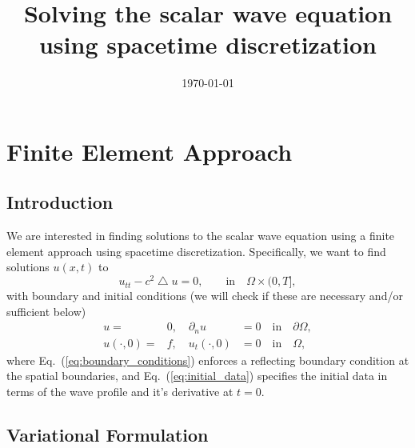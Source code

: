 \documentclass[nofootinbib,preprintnumbers,superscriptaddress,notitlepage]{revtex4-1}
\newcommand{\<}{\begin{equation}}
\newcommand{\?}{\end{equation}}
\begin{document}
\title{Solving the scalar wave equation using spacetime discretization}
\date{\today}
\maketitle

\section{Finite Element Approach}

\subsection{Introduction}

We are interested in finding solutions to the scalar wave equation using a 
finite element approach using spacetime discretization. Specifically, we want
to find solutions $u(x, t)$ to
\begin{equation}
\label{eq:wave_equation}
u_{tt} - c^2 \bigtriangleup u = 0, \qquad \text{in} \quad \Omega \times (0, T],
\end{equation}
with boundary and initial conditions (we will check if these are necessary
and/or sufficient below)
\begin{eqnarray}
\label{eq:boundary_conditions}
u =& 0,\quad \partial_{n} u &= 0 \quad \text{in} \quad \partial\Omega,\\
\label{eq:initial_data}
u(\cdot, 0) =& f,\quad u_t(\cdot, 0) &=  0 \quad \text{in} \quad \Omega,
\end{eqnarray}
where Eq.~(\ref{eq:boundary_conditions}) enforces a reflecting boundary
condition at the spatial boundaries, and Eq.~(\ref{eq:initial_data}) specifies
the initial data in terms of the wave profile and it's derivative at $t=0$.\\

\subsection{Variational Formulation}
\end{document}
